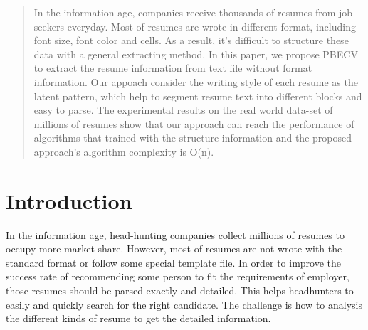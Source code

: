 \documentclass{acm_proc_article-sp}
\begin{document}
\maketitle
\begin{abstract}


In the information age, companies receive thousands of resumes from job seekers everyday. 
Most of resumes are wrote in different format, including font size, font color and cells. %
As a result, it's difficult to structure these data with a general extracting method. 
In this paper, we propose PBECV to extract the resume information from text file without format information. 
Our appoach consider the writing style of each resume as the latent pattern, which help to segment resume text into different blocks and easy to parse. 
The experimental results on the real world data-set of millions of resumes show that our approach can reach the performance of algorithms that trained with the structure information and the proposed approach's algorithm complexity is O(n).

\end{abstract}




\section{Introduction}

In the information age, head-hunting companies collect millions of resumes to occupy more market share.
However, most of resumes are not wrote with the standard format or follow some special template file.
In order to improve the success rate of recommending some person to fit the requirements of employer, those resumes should be parsed exactly and detailed.
This helps headhunters to easily and quickly search for the right candidate.
The challenge is how to analysis the different kinds of resume to get the detailed information.
\end{document}
